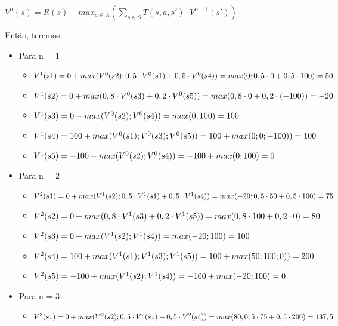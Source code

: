 \documentclass[12pt,letterpaper]{article}
\begin{document}
	\begin{center}
		$V^n(s) = R(s) + max_{a \in A}({\sum_{s \in S}T(s, a, s')\cdot V^{n-1}(s')})$
	\end{center}
	
	Então, teremos:
	
	\begin{itemize}
		\item Para n = 1
		\begin{itemize}
			\item $V^1(s1) = 0 + max(V^0(s2);0,5\cdot V^0(s1) + 0,5\cdot V^0(s4)) \\= max(0;0,5\cdot 0 + 0,5\cdot 100) = 50$
			\item $V^1(s2) = 0 + max(0,8\cdot V^0(s3) + 0,2\cdot V^0(s5)) \\= max(0,8\cdot 0 + 0,2\cdot (-100)) = -20$
			\item $V^1(s3) = 0 + max(V^0(s2);V^0(s4)) \\= max(0; 100) = 100$
			\item $V^1(s4) = 100 + max(V^0(s1);V^0(s3);V^0(s5)) \\= 100 + max(0;0;-100)) = 100$
			\item $V^1(s5) = -100 + max(V^0(s2);V^0(s4)) \\= -100 + max(0;100) = 0$
		\end{itemize}
		\item Para n = 2
		\begin{itemize}
			\item $V^2(s1) = 0 + max(V^1(s2);0,5\cdot V^1(s1) + 0,5\cdot V^1(s4)) \\= max(-20;0,5\cdot 50 + 0,5\cdot 100) = 75$
			\item $V^2(s2) = 0 + max(0,8\cdot V^1(s3) + 0,2\cdot V^1(s5)) \\= max(0,8\cdot 100 + 0,2\cdot 0) = 80$
			\item $V^2(s3) = 0 + max(V^1(s2);V^1(s4)) \\= max(-20; 100) = 100$
			\item $V^2(s4) = 100 + max(V^1(s1);V^1(s3);V^1(s5)) \\= 100 + max(50;100;0)) = 200$
			\item $V^2(s5) = -100 + max(V^1(s2);V^1(s4)) \\= -100 + max(-20;100) = 0$
		\end{itemize}
		\item Para n = 3
		\begin{itemize}
			\item $V^3(s1) = 0 + max(V^2(s2);0,5\cdot V^2(s1) + 0,5\cdot V^2(s4)) \\= max(80;0,5\cdot 75 + 0,5\cdot 200) = 137,5$

\end{itemize}
\end{itemize}
\end{document}
